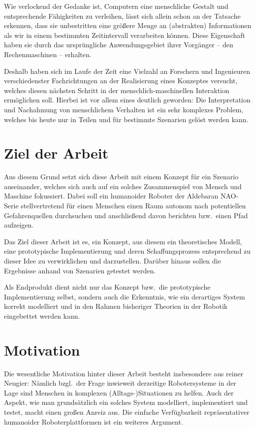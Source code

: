 \documentclass[fontsize=11pt,paper=a4,twoside,openright]{scrreprt}
\begin{document}
Wie verlockend der Gedanke ist, Computern eine menschliche Gestalt und entsprechende Fähigkeiten zu verleihen, lässt sich allein schon an der Tatsache erkennen, dass sie unbestritten eine größere Menge an (abstrakten) Informationen als wir in einem bestimmten Zeitintervall verarbeiten können.
Diese Eigenschaft haben sie durch das ursprüngliche Anwendungsgebiet ihrer Vorgänger -- den Rechenmaschinen -- erhalten.

Deshalb haben sich im Laufe der Zeit eine Vielzahl an Forschern und Ingenieuren verschiedenster Fachrichtungen an der Realisierung eines Konzeptes versucht, welches diesen nächsten Schritt in der menschlich-maschinellen Interaktion ermöglichen soll.
Hierbei ist vor allem eines deutlich geworden: Die Interpretation und Nachahmung von menschlichem Verhalten ist ein sehr komplexes Problem, welches bis heute nur in Teilen und für bestimmte Szenarien gelöst werden kann.

\section{Ziel der Arbeit}
\label{sec:Ziel der Arbeit}
Aus diesem Grund setzt sich diese Arbeit mit einem Konzept für ein Szenario auseinander, welches sich auch auf ein solches Zusammenspiel von Mensch und Maschine fokussiert.
Dabei soll ein humanoider Roboter der Aldebaran NAO-Serie stellvertretend für einen Menschen einen Raum autonom nach potentiellen Gefahrenquellen durchsuchen und anschließend davon berichten bzw.\ einen Pfad aufzeigen.

Das Ziel dieser Arbeit ist es, ein Konzept, aus diesem ein theoretisches Modell, eine prototypische Implementierung und deren Schaffungsprozess entsprechend zu dieser Idee zu verwirklichen und darzustellen.
Darüber hinaus sollen die Ergebnisse anhand von Szenarien getestet werden.

Als Endprodukt dient nicht nur das Konzept bzw.\ die prototypische Implementierung selbst, sondern auch die Erkenntnis, wie ein derartiges System korrekt modelliert und in den Rahmen bisheriger Theorien in der Robotik eingebettet werden kann.

\section{Motivation}
\label{sec:Motivation}
Die wesentliche Motivation hinter dieser Arbeit besteht insbesondere aus reiner Neugier: Nämlich bzgl.\ der Frage inwieweit derzeitige Robotersysteme in der Lage sind Menschen in komplexen (Alltags-)Situationen zu helfen.
Auch der Aspekt, wie man grundsätzlich ein solches System modelliert, implementiert und testet, macht einen großen Anreiz aus.
Die einfache Verfügbarkeit repräsentativer humanoider Roboterplattformen ist ein weiteres Argument.
\end{document}
